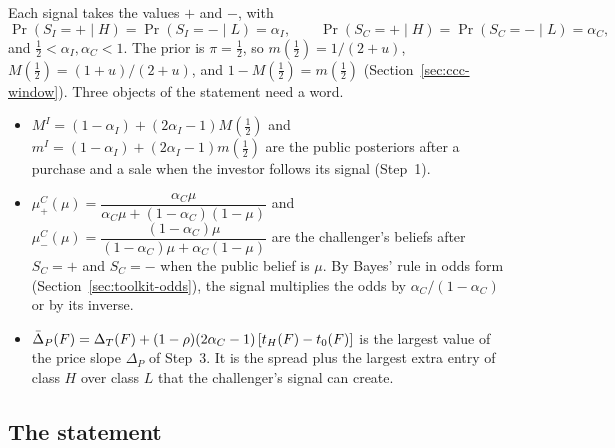 Each signal takes the values \(+\) and \(-\), with
\[
\Pr(S_I=+\mid H)=\Pr(S_I=-\mid L)=\alpha_I,\qquad
\Pr(S_C=+\mid H)=\Pr(S_C=-\mid L)=\alpha_C,
\]
and \(\tfrac12<\alpha_I,\alpha_C<1\). The prior is \(\pi=\tfrac12\), so \(m(\tfrac12)=1/(2+u)\), \(M(\tfrac12)=(1+u)/(2+u)\), and \(1-M(\tfrac12)=m(\tfrac12)\) (Section~\ref{sec:ccc-window}).
Three objects of the statement need a word.
\begin{itemize}
\item \(M^I=(1-\alpha_I)+(2\alpha_I-1)M(\tfrac12)\) and \(m^I=(1-\alpha_I)+(2\alpha_I-1)m(\tfrac12)\) are the public posteriors after a purchase and a sale when the investor follows its signal (Step~1).
\item \(\mu^C_+(\mu)=\dfrac{\alpha_C\mu}{\alpha_C\mu+(1-\alpha_C)(1-\mu)}\) and \(\mu^C_-(\mu)=\dfrac{(1-\alpha_C)\mu}{(1-\alpha_C)\mu+\alpha_C(1-\mu)}\) are the challenger's beliefs after \(S_C=+\) and \(S_C=-\) when the public belief is \(\mu\). By Bayes' rule in odds form (Section~\ref{sec:toolkit-odds}), the signal multiplies the odds by \(\alpha_C/(1-\alpha_C)\) or by its inverse.
\item \(\bar\Delta_P(F)=\Delta_T(F)+(1-\rho)(2\alpha_C-1)\,[t_H(F)-t_0(F)]\) is the largest value of the price slope \(\Delta_P\) of Step~3. It is the spread plus the largest extra entry of class \(H\) over class \(L\) that the challenger's signal can create.
\end{itemize}

\subsection{The statement}

